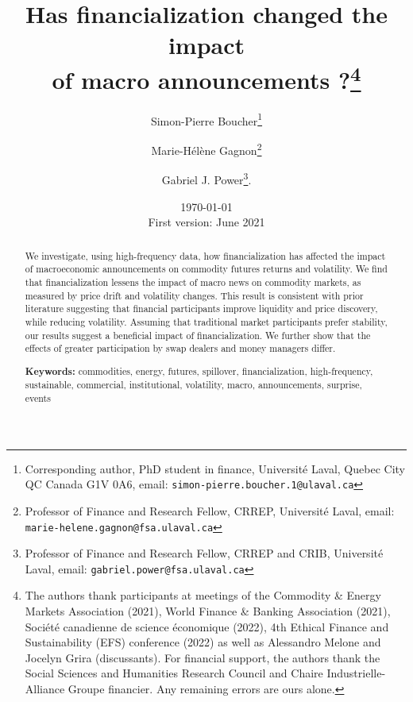 \documentclass[12pt]{article}
\title{\textbf{Has financialization changed the impact\\ of macro announcements ?}\thanks{The authors thank participants at meetings of the Commodity \& Energy Markets Association (2021),  World Finance \& Banking Association (2021), Société canadienne de science  économique (2022), 4th Ethical Finance and Sustainability (EFS) conference (2022) as well as Alessandro Melone and Jocelyn Grira (discussants). For financial support, the authors thank the Social Sciences and Humanities Research Council and Chaire Industrielle-Alliance Groupe financier. Any remaining errors are ours alone.}}
\author{Simon-Pierre Boucher\footnote{Corresponding author, PhD student in finance, Université Laval, Quebec City QC Canada G1V 0A6, email:   \texttt{simon-pierre.boucher.1@ulaval.ca}}\and Marie-H{\'e}l{\`e}ne Gagnon\footnote{Professor of Finance and Research Fellow, CRREP, Université Laval, email: \texttt{marie-helene.gagnon@fsa.ulaval.ca}}\and Gabriel J. Power\footnote{Professor of Finance and Research Fellow, CRREP and CRIB, Université Laval, email:   \texttt{gabriel.power@fsa.ulaval.ca}}. 
}
\date{ \today \\ First version: June 2021}
\begin{document}
\begin{titlepage}
\maketitle





\begin{abstract}
\noindent 
\singlespacing
 We investigate, using high-frequency data, how financialization has affected the impact of macroeconomic announcements on commodity futures returns and volatility. We find that financialization lessens the impact of macro news on commodity markets, as measured by price drift and volatility changes. This result is consistent with prior literature suggesting that financial participants improve liquidity and price discovery, while reducing volatility. Assuming that traditional market participants prefer stability, our results suggest a beneficial impact of financialization. We further show that the effects of greater participation by swap dealers and money managers differ.%

\vspace{0.2in}
\noindent\textbf{Keywords:} commodities, energy, futures,  spillover, financialization, high-frequency, sustainable, commercial, institutional, volatility, macro, announcements, surprise, events\\


\bigskip
\end{abstract}
\setcounter{page}{0}
\thispagestyle{empty}
\end{titlepage}
\pagebreak \newpage




\doublespacing
\end{document}
